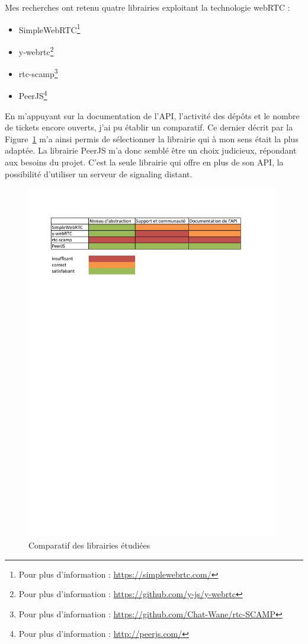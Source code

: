 \documentclass{tnreport}
\begin{document}
Mes recherches ont retenu quatre librairies exploitant la technologie webRTC :

\begin{itemize}
  \item SimpleWebRTC\footnote{Pour plus d'information : \url{https://simplewebrtc.com/}}
  \item y-webrtc\footnote{Pour plus d'information : \url{https://github.com/y-js/y-webrtc}}
  \item rtc-scamp\footnote{Pour plus d'information : \url{https://github.com/Chat-Wane/rtc-SCAMP}}
  \item PeerJS\footnote{Pour plus d'information : \url{http://peerjs.com/}}
\end{itemize}

En m'appuyant sur la documentation de l'API, l'activité des dépôts et le nombre de tickets encore ouverts, j'ai pu établir un comparatif. Ce dernier décrit par la Figure~\ref{fig:comp-lib} m'a ainsi permis de sélectionner la librairie qui à mon sens était la plus adaptée. La librairie PeerJS m'a donc semblé être un choix judicieux, répondant aux besoins du projet. C'est la seule librairie qui offre en plus de son API, la possibilité d'utiliser un serveur de signaling distant. 

\begin{figure}[!h]
  \centering
  \includegraphics[width=11cm]{figures/comparatif-lib}
  \caption{Comparatif des librairies étudiées}
  \label{fig:comp-lib}
\end{figure}
\end{document}

